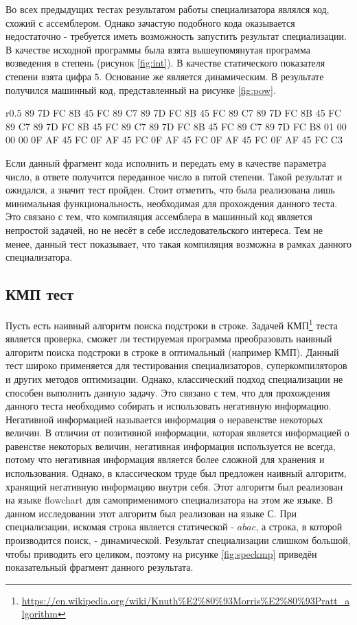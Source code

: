 Во всех предыдущих тестах результатом работы специализатора являлся код, схожий с ассемблером. Однако зачастую подобного кода оказывается недостаточно - требуется иметь возможность запустить результат специализации. В качестве исходной программы была взята вышеупомянутая программа возведения в степень (рисунок \ref{fig:int}). В качестве статического показателя степени взята цифра $5$. Основание же является динамическим. В результате получился машинный код, представленный на рисунке \ref{fig:pow}.
\begin{wrapfigure}{r}{0.5\textwidth}
89 7D FC 8B 45 FC 89 C7 89 7D FC 8B 45 FC 89 C7 89 7D FC 8B 45 FC 89 C7 89 7D FC 8B 45 FC 89 C7 89 7D FC 8B 45 FC 89 C7 89 7D FC B8 01 00 00 00 0F AF 45 FC 0F AF 45 FC 0F AF 45 FC 0F AF 45 FC 0F AF 45 FC C3
\caption{ Сумма двух чисел}
\label{fig:pow}
\end{wrapfigure}
Если данный фрагмент кода исполнить и передать ему в качестве параметра число, в ответе получится переданное число в пятой степени. Такой результат и ожидался, а значит тест пройден. Стоит отметить, что была реализована лишь минимальная функциональность, необходимая для прохождения данного теста. Это связано с тем, что компиляция ассемблера в машинный код является непростой задачей, но не несёт в себе исследовательского интереса. Тем не менее, данный тест показывает, что такая компиляция возможна в рамках данного специализатора.

\subsection{ КМП тест}
Пусть есть наивный алгоритм поиска подстроки в строке. Задачей КМП\footnote{\url{https://en.wikipedia.org/wiki/Knuth\%E2\%80\%93Morris\%E2\%80\%93Pratt\_algorithm}} теста является проверка, сможет ли тестируемая программа преобразовать наивный алгоритм поиска подстроки в строке в оптимальный (например КМП). Данный тест широко применяется для тестирования специализаторов, суперкомпиляторов и других методов оптимизации. Однако, классический подход специализации не способен выполнить данную задачу. Это связано с тем, что для прохождения данного теста необходимо собирать и использовать негативную информацию. Негативной информацией называется информация о неравенстве некоторых величин. В отличии от позитивной информации, которая является информацией о равенстве некоторых величин, негативная информация используется не всегда, потому что негативная информация является более сложной для хранения и использования. Однако, в классическом труде \cite{PEAPG} был предложен наивный алгоритм, хранящий негативную информацию внутри себя. Этот алгоритм был реализован на языке flowchart для самоприменимого специализатора на этом же языке. В данном исследовании этот алгоритм был реализован на языке С.  При специализации, искомая строка является статической - $abac$, а строка, в которой производится поиск, - динамической. Результат специализации слишком большой, чтобы приводить его целиком, поэтому на рисунке \ref{fig:speckmp} приведён показательный фрагмент данного результата. 


